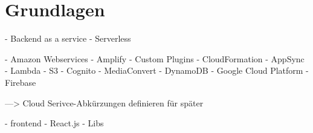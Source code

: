 \chapter{Grundlagen}

- Backend as a service
- Serverless

- Amazon Webservices
  - Amplify
  - Custom Plugins
  - CloudFormation
  - AppSync
  - Lambda
  - S3
  - Cognito
  - MediaConvert
  - DynamoDB
- Google Cloud Platform
  - Firebase


---> Cloud Serivce-Abkürzungen definieren für später


- frontend
  - React.js
  - Libs
